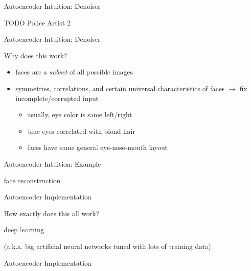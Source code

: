 \begin{frame}{Autoencoder Intuition: Denoiser}

TODO Police Artist 2

\end{frame}

\begin{frame}{Autoencoder Intuition: Denoiser}

Why does this work?

\begin{itemize}

\item faces are a \textit{subset} of all possible images
\item symmetries, correlations, and certain universal characteristics of faces $\rightarrow$ fix incomplete/corrupted input
\begin{itemize}
\item usually, eye color is same left/right
\item blue eyes correlated with blond hair
\item faces have same general eye-nose-mouth layout
\end{itemize}

\end{itemize}

\end{frame}

\begin{frame}{Autoencoder Intuition: Example}

face reconstruction

\end{frame}

\begin{frame}{Autoencoder Implementation}

How exactly does this all work?

deep learning

(a.k.a. big artificial neural networks tuned with lots of training data)

\end{frame}

\begin{frame}{Autoencoder Implementation}



\end{frame}
